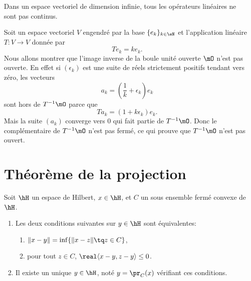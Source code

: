 Dans un espace vectoriel de dimension infinie, tous les opérateurs linéaires ne sont pas continus.

\begin{example}
    Soit un espace vectoriel \( V\) engendré par la base \( \{ e_k \}_{k\in \eN}\) et l'application linéaire \( T\colon V\to V\) donnée par
    \begin{equation}
        Te_k=ke_k.
    \end{equation}
    Nous allons montrer que l'image inverse de la boule unité ouverte \( \mO\) n'est pas ouverte. En effet si \( (\epsilon_k)\) est une suite de réels strictement positifs tendant vers zéro, les vecteurs
    \begin{equation}
        a_k=\left( \frac{1}{ k }+\epsilon_k \right)e_k
    \end{equation}
    sont hors de \( T^{-1}\mO\) parce que
    \begin{equation}
        Ta_k=(1+k\epsilon_k)e_k.
    \end{equation}
    Mais la suite \( (a_k)\) converge vers \( 0\) qui fait partie de \( T^{-1}\mO\). Donc le complémentaire de \( T^{-1}\mO\) n'est pas fermé, ce qui prouve que \( T^{-1}\mO\) n'est pas ouvert.
\end{example}

\section{Théorème de la projection}

\begin{theorem} \label{ThoProjOrthuzcYkz}
    Soit \( \hH\) un espace de Hilbert, \( x\in \hH\), et \( C\) un sous ensemble fermé convexe de \( \hH\).
    \begin{enumerate}
        \item
            Les deux conditions suivantes sur \( y\in \hH\) sont équivalentes:
    \begin{enumerate}
        \item   \label{ETsfYCSItemi}
            \( \| x-y \|=\inf\{ \| x-z \|\tq z\in C \}\),
        \item\label{ETsfYCSItemii}
            pour tout \( z\in C\), \( \real\langle x-y, z-y\rangle \leq 0\).
    \end{enumerate}
\item
    Il existe un unique \( y\in \hH\), noté \( y=\pr_C(x)\) vérifiant ces conditions.
    \end{enumerate}
\end{theorem}

